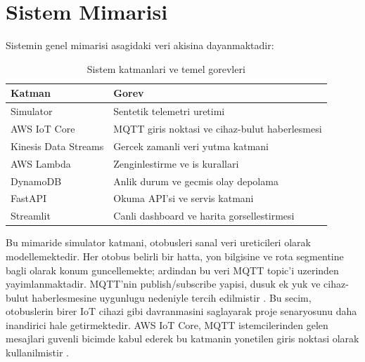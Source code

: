 \section{Sistem Mimarisi}

Sistemin genel mimarisi asagidaki veri akisina dayanmaktadir:

\begin{center}
\end{center}

\begin{table}[!t]
    \caption{Sistem katmanlari ve temel gorevleri}
    \label{tab:architecture-layers}
    \centering
    \footnotesize
    \begin{tabular}{p{} p{}}
        \toprule
        Katman & Gorev \\
        \midrule
        Simulator & Sentetik telemetri uretimi \\
        AWS IoT Core & MQTT giris noktasi ve cihaz-bulut haberlesmesi \\
        Kinesis Data Streams & Gercek zamanli veri yutma katmani \\
        AWS Lambda & Zenginlestirme ve is kurallari \\
        DynamoDB & Anlik durum ve gecmis olay depolama \\
        FastAPI & Okuma API'si ve servis katmani \\
        Streamlit & Canli dashboard ve harita gorsellestirmesi \\
        \bottomrule
    \end{tabular}
\end{table}

Bu mimaride simulator katmani, otobusleri sanal veri ureticileri olarak modellemektedir. Her otobus belirli bir hatta, yon bilgisine ve rota segmentine bagli olarak konum guncellemekte; ardindan bu veri MQTT topic'i uzerinden yayimlanmaktadir. MQTT'nin publish/subscribe yapisi, dusuk ek yuk ve cihaz-bulut haberlesmesine uygunlugu nedeniyle tercih edilmistir \cite{mqtt311}. Bu secim, otobuslerin birer IoT cihazi gibi davranmasini saglayarak proje senaryosunu daha inandirici hale getirmektedir. AWS IoT Core, MQTT istemcilerinden gelen mesajlari guvenli bicimde kabul ederek bu katmanin yonetilen giris noktasi olarak kullanilmistir \cite{aws_iot_mqtt}.

